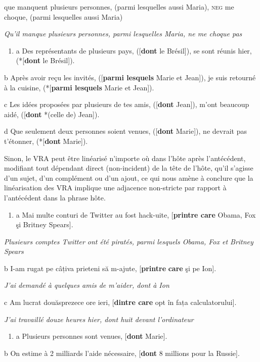     que manquent plusieurs personnes, (parmi lesquelles aussi Maria), \textsc{neg} me choque, (parmi lesquelles aussi Maria)

{\itshape
Qu'il manque plusieurs personnes, parmi lesquelles Maria, ne me choque pas}


\begin{enumerate}
\item \label{bkm:Ref293501723}a  Des représentants de plusieurs pays, ([\textbf{dont} le Brésil]), se sont réunis hier, (*[\textbf{dont} le Brésil]). 


\end{enumerate}
  b  Après avoir reçu les invités, ([\textbf{parmi lesquels} Marie et Jean]), je suis retourné à la cuisine, (*[\textbf{parmi lesquels} Marie et Jean]).

  c  Les idées proposées par plusieurs de tes amis, ([\textbf{dont} Jean]), m'ont beaucoup aidé, ([\textbf{dont} *(celle de) Jean]).

  d  Que seulement deux personnes soient venues, ([\textbf{dont} Marie]), ne devrait pas t'étonner, (*[\textbf{dont} Marie]).

Sinon, le VRA peut être linéarisé n'importe où dans l'hôte après l'antécédent, modifiant tout dépendant direct (non-incident) de la tête de l'hôte, qu'il s'agisse d'un sujet, d'un complément ou d'un ajout, ce qui nous amène à conclure que la linéarisation des VRA implique une adjacence non-stricte par rapport à l'antécédent dans la phrase hôte.


\begin{enumerate}
\item a  Mai multe conturi de Twitter au fost hack-uite, [\textbf{printre care} Obama, Fox şi Britney Spears]. 


\end{enumerate}
{\itshape
Plusieurs comptes Twitter ont été piratés, parmi lesquels Obama, Fox et Britney Spears}

  b  I-am rugat pe câțiva prieteni să m-ajute, [\textbf{printre} \textbf{care} şi pe Ion].

{\itshape
J'ai demandé à quelques amis de m'aider, dont à Ion}

  c  Am lucrat douăsprezece ore ieri, [\textbf{dintre care} opt în fața calculatorului].

{\itshape
J'ai travaillé douze heures hier, dont huit devant l'ordinateur}


\begin{enumerate}
\item a  Plusieurs personnes sont venues, [\textbf{dont} Marie]. 


\end{enumerate}
  b  On estime à 2 milliards l'aide nécessaire, [\textbf{dont} 8 millions pour la Russie].

